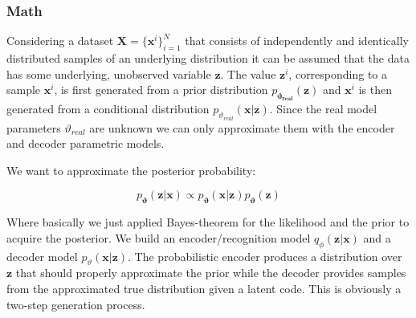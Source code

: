 \documentclass[12pt, english]{article}
\begin{document}
\subsubsection{Math}

\vspace{4mm}

\par Considering a dataset $\boldsymbol{X} = \big\{\boldsymbol{\bm{x}}^{i}\big\}_{i = 1}^{N}$ that consists of independently and identically distributed samples of an underlying distribution it can be assumed that the data has some underlying, unobserved variable $\boldsymbol{\bm{z}}$. The value $\boldsymbol{\bm{z}}^{i}$, corresponding to a sample $\boldsymbol{\bm{x}}^{i}$, is first generated from a prior distribution $p_{\boldsymbol{\vartheta_{real}}}(\boldsymbol{\bm{z}})$ and $\boldsymbol{\bm{x}}^{i}$ is then generated from a conditional distribution $p_{\vartheta_{real}}(\boldsymbol{\bm{x}} | \boldsymbol{\bm{z}})$. Since the real model parameters $\vartheta_{real}$ are unknown we can only approximate them with the encoder and decoder parametric models.

\vspace{4mm}

\par We want to approximate the posterior probability:

\vspace{4mm}

\begin{equation}
    p_{\boldsymbol{\vartheta}}(\boldsymbol{\bm{z}} | \boldsymbol{\bm{x}}) \propto p_{\boldsymbol{\vartheta}}(\boldsymbol{\bm{x}} | \boldsymbol{\bm{z}}) p_{\boldsymbol{\vartheta}}(\boldsymbol{\bm{z}})
\end{equation}

\vspace{4mm}

\par Where basically we just applied Bayes-theorem for the likelihood and the prior to acquire the posterior. We build an encoder/recognition model $q_{\phi}(\boldsymbol{\bm{z}} | \boldsymbol{\bm{x}})$ and a decoder model $p_{\vartheta}(\boldsymbol{\bm{x}} | \boldsymbol{\bm{z}})$. The probabilistic encoder produces a distribution over $\boldsymbol{\bm{z}}$ that should properly approximate the prior while the  decoder provides samples from the approximated true distribution given a latent code. This is obviously a two-step generation process. 

\vspace{4mm}
\end{document}
